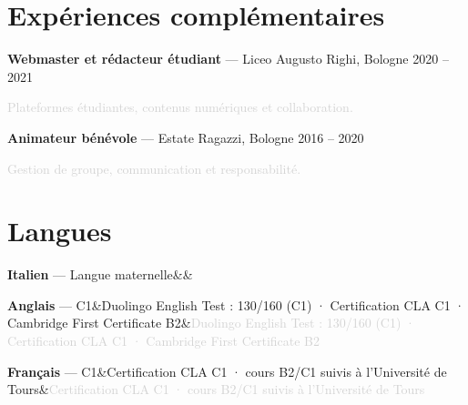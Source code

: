 \documentclass[a4paper,10pt]{article}
\newcommand{\langentry}[3]{\noindent\textbf{#1} — #2\ifx&#3&\else\hfill\textcolor{lightgray}{\small #3}\fi\par\vspace{0.15em}}
\begin{document}
\section{Expériences complémentaires}
\textbf{Webmaster et rédacteur étudiant} — Liceo Augusto Righi, Bologne \hfill \textcolor{accent}{2020 -- 2021}\par
\textcolor{lightgray}{\small Plateformes étudiantes, contenus numériques et collaboration.}\par
\textbf{Animateur bénévole} — Estate Ragazzi, Bologne \hfill \textcolor{accent}{2016 -- 2020}\par
\textcolor{lightgray}{\small Gestion de groupe, communication et responsabilité.}

\section{Langues}
\langentry{Italien}{Langue maternelle}{}
\langentry{Anglais}{C1}{Duolingo English Test : 130/160 (C1) · Certification CLA C1 · Cambridge First Certificate B2}
\langentry{Français}{C1}{Certification CLA C1 · cours B2/C1 suivis à l'Université de Tours}
\end{document}

